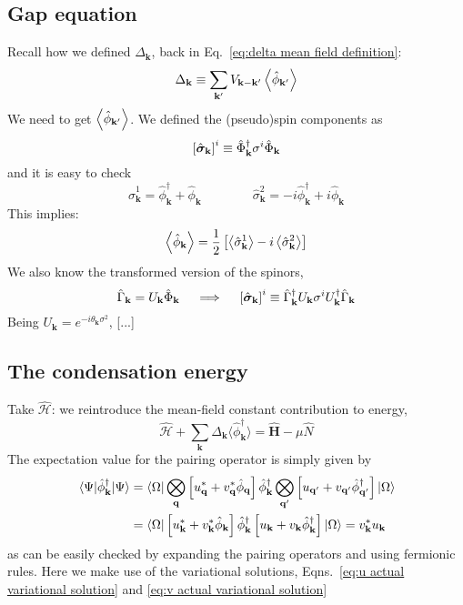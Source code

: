 \subsection{Gap equation}\label{subsec:gap equation}

Recall how we defined $\Delta_\mathbf{k}$, back in Eq.~\eqref{eq:delta mean field definition}:
\[
	\Delta_\mathbf{k} \equiv \sum_{\mathbf{k}'} V_{\mathbf{k}-\mathbf{k}'} \ev{\hat{\phi}_{\mathbf{k}'}}
\]
We need to get $\ev{\hat{\phi}_{\mathbf{k}'}}$. We defined the (pseudo)spin components as
\[
	\left[{\hat{\bm{\sigma}}_\mathbf{k}}\right]^i \equiv \hat{\Phi}_\mathbf{k}^\dagger \sigma^i \hat{\Phi}_\mathbf{k}
\]
and it is easy to check
\[
	\hat{\sigma}_\mathbf{k}^1 = \hat{\phi}_\mathbf{k}^\dagger + \hat{\phi}_\mathbf{k}
	\qquad\qquad
	\hat{\sigma}_\mathbf{k}^2 = -i \hat{\phi}_\mathbf{k}^\dagger + i \hat{\phi}_\mathbf{k}
\]
This implies:
\[
	\ev{\hat{\phi}_\mathbf{k}} = \frac{1}{2} \lrS{ \big\langle \hat{\sigma}_\mathbf{k}^1 \big\rangle - i \ev{\hat{\sigma}_\mathbf{k}^2} }
\]
We also know the transformed version of the spinors,
\[
	\hat{\Gamma}_\mathbf{k} = U_\mathbf{k} \hat{\Phi}_\mathbf{k}
	\quad\implies\quad
	\left[{\hat{\bm{\sigma}}_\mathbf{k}}\right]^i \equiv \hat{\Gamma}_\mathbf{k}^\dagger U_\mathbf{k} \sigma^i U_\mathbf{k}^\dagger \hat{\Gamma}_\mathbf{k}
\]
Being $U_\mathbf{k} = e^{-i \theta_\mathbf{k} \sigma^2}$, [...]

\subsection{The condensation energy}

Take $\hat{\mathcal{H}}$: we reintroduce the mean-field constant contribution to energy,
\[
	\hat{\mathcal{H}} + \sum_\mathbf{k} \Delta_\mathbf{k} \big\langle \hat{\phi}_\mathbf{k}^\dagger \big\rangle = \hat{\bm H} - \mu\hat{N}
\]
The expectation value for the pairing operator is simply given by
\[
\begin{aligned}
	\mel{\Psi}{\hat{\phi}_\mathbf{k}^\dagger}{\Psi} &= \bra{\Omega} \bigotimes_\mathbf{q} \left[{u_\mathbf{q}^* + v_\mathbf{q}^* \hat{\phi}_\mathbf{q}}\right] \hat{\phi}_\mathbf{k}^\dagger \bigotimes_{\mathbf{q}'} \left[{u_{\mathbf{q}'} + v_{\mathbf{q}'} \hat{\phi}_{\mathbf{q}'}^\dagger}\right] \ket{\Omega} \\
	&= \bra{\Omega} \left[{u_\mathbf{k}^* + v_\mathbf{k}^* \hat{\phi}_\mathbf{k}}\right] \hat{\phi}_\mathbf{k}^\dagger \left[{u_\mathbf{k} + v_\mathbf{k} \hat{\phi}_\mathbf{k}^\dagger}\right] \ket{\Omega} = v_\mathbf{k}^* u_\mathbf{k}
\end{aligned}
\]
as can be easily checked by expanding the pairing operators and using fermionic rules. Here we make use of the variational solutions, Eqns.~\eqref{eq:u actual variational solution} and \eqref{eq:v actual variational solution}


